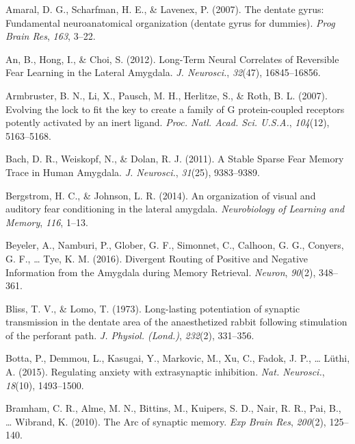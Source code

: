 \documentclass[12pt,a4paper,]{report}
\begin{document}
\hypertarget{ref-amaralux5fdentateux5f2007}{}
Amaral, D. G., Scharfman, H. E., \& Lavenex, P. (2007). The dentate
gyrus: Fundamental neuroanatomical organization (dentate gyrus for
dummies). \emph{Prog Brain Res}, \emph{163}, 3--22.

\hypertarget{ref-anux5flong-termux5f2012}{}
An, B., Hong, I., \& Choi, S. (2012). Long-Term Neural Correlates of
Reversible Fear Learning in the Lateral Amygdala. \emph{J. Neurosci.},
\emph{32}(47), 16845--16856.

\hypertarget{ref-armbrusterux5fevolvingux5f2007}{}
Armbruster, B. N., Li, X., Pausch, M. H., Herlitze, S., \& Roth, B. L.
(2007). Evolving the lock to fit the key to create a family of G
protein-coupled receptors potently activated by an inert ligand.
\emph{Proc. Natl. Acad. Sci. U.S.A.}, \emph{104}(12), 5163--5168.

\hypertarget{ref-bachux5fstableux5f2011}{}
Bach, D. R., Weiskopf, N., \& Dolan, R. J. (2011). A Stable Sparse Fear
Memory Trace in Human Amygdala. \emph{J. Neurosci.}, \emph{31}(25),
9383--9389.

\hypertarget{ref-bergstromux5forganizationux5f2014}{}
Bergstrom, H. C., \& Johnson, L. R. (2014). An organization of visual
and auditory fear conditioning in the lateral amygdala.
\emph{Neurobiology of Learning and Memory}, \emph{116}, 1--13.

\hypertarget{ref-beyelerux5fdivergentux5f2016}{}
Beyeler, A., Namburi, P., Glober, G. F., Simonnet, C., Calhoon, G. G.,
Conyers, G. F., \ldots{} Tye, K. M. (2016). Divergent Routing of
Positive and Negative Information from the Amygdala during Memory
Retrieval. \emph{Neuron}, \emph{90}(2), 348--361.

\hypertarget{ref-blissux5flong-lastingux5f1973}{}
Bliss, T. V., \& Lomo, T. (1973). Long-lasting potentiation of synaptic
transmission in the dentate area of the anaesthetized rabbit following
stimulation of the perforant path. \emph{J. Physiol. (Lond.)},
\emph{232}(2), 331--356.

\hypertarget{ref-bottaux5fregulatingux5f2015}{}
Botta, P., Demmou, L., Kasugai, Y., Markovic, M., Xu, C., Fadok, J. P.,
\ldots{} Lüthi, A. (2015). Regulating anxiety with extrasynaptic
inhibition. \emph{Nat. Neurosci.}, \emph{18}(10), 1493--1500.

\hypertarget{ref-bramhamux5farcux5f2010}{}
Bramham, C. R., Alme, M. N., Bittins, M., Kuipers, S. D., Nair, R. R.,
Pai, B., \ldots{} Wibrand, K. (2010). The Arc of synaptic memory.
\emph{Exp Brain Res}, \emph{200}(2), 125--140.
\end{document}
